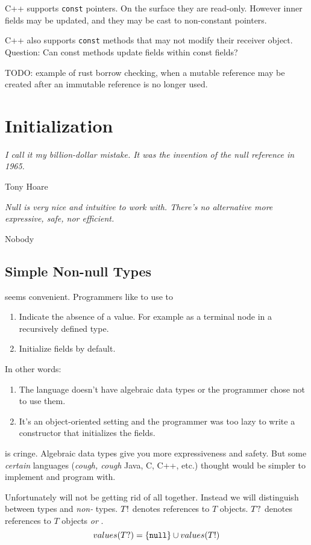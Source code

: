\documentclass{article}
\begin{document}
C++ supports \texttt{const} pointers.
On the surface they are read-only.
However inner fields may be updated, and they may be cast to non-constant pointers.

C++ also supports \texttt{const} methods that may not modify their receiver object.
Question: Can const methods update fields within const fields?

TODO: example of rust borrow checking, when a mutable reference may be created after an immutable reference is no longer used.

\section{Initialization}

\epigraph{\itshape I call it my billion-dollar mistake. It was the invention of the null reference in 1965.}{Tony Hoare}

\epigraph{\itshape Null is very nice and intuitive to work with. There's no alternative more expressive, safe, nor efficient.}{Nobody}

\subsection{Simple Non-null Types}

\cringe{} seems convenient.
Programmers like to use \cringe{} to
\begin{enumerate}
\item Indicate the absence of a value. For example as a terminal node in a recursively defined type.
\item Initialize fields by default.
\end{enumerate}

In other words:
\begin{enumerate}
\item The language doesn't have algebraic data types or the programmer chose not to use them.
\item It's an object-oriented setting and the programmer was too lazy to write a constructor that initializes the fields.
\end{enumerate}

\cringe{} is cringe.
Algebraic data types give you more expressiveness and safety.
But some \textit{certain} languages (\textit{cough, cough} Java, C, C++, etc.) thought \cringe{} would be simpler to implement and program with.

Unfortunately will not be getting rid of \cringe{} all together.
Instead we will distinguish between \cringe{} types and \textit{non-\cringe{}} types.
$T !$ denotes references to $T$ objects.
$T ?$ denotes references to $T$ objects \textit{or} \cringe{}.
$$ values(T ?) = \{ \texttt{null}{} \} \cup values(T !) $$
\end{document}
